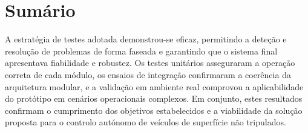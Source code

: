 \section{Sumário}

A estratégia de testes adotada demonstrou-se eficaz, permitindo a deteção e resolução de problemas de forma faseada e garantindo que o sistema final apresentava fiabilidade e robustez. Os testes unitários asseguraram a operação correta de cada módulo, os ensaios de integração confirmaram a coerência da arquitetura modular, e a validação em ambiente real comprovou a aplicabilidade do protótipo em cenários operacionais complexos. Em conjunto, estes resultados confirmam o cumprimento dos objetivos estabelecidos e a viabilidade da solução proposta para o controlo autónomo de veículos de superfície não tripulados.  
